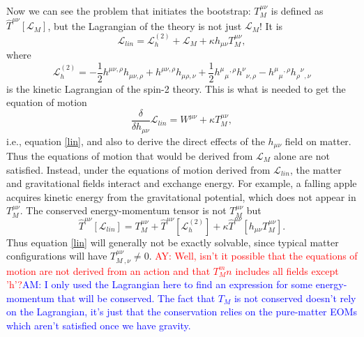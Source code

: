\documentclass[aps,physrev,preprint,groupedaddress]{revtex4-2}
\newcommand{\AY}[1]{\textcolor{red}{AY: #1}}
\newcommand{\AM}[1]{\textcolor{blue}{AM: #1}}
\begin{document}
Now we can see the problem that initiates the bootstrap: \(T_{M}^{\mu\nu}\) is defined as \({\widehat{T}}^{\mu\nu}\left\lbrack \mathcal{L}_M \right\rbrack\), but the Lagrangian of the theory is not just \(\mathcal{L}_{M}\)! It is
\begin{equation}
\mathcal{L}_{lin}=\mathcal{L}_{h}^{(2)}+\mathcal{L}_{M}+\kappa h_{\mu\nu}T_M^{\mu\nu},
\end{equation}
where
\begin{equation} \label{Lh2}
\mathcal{L}_{h}^{(2)} = - \frac{1}{2}h^{\mu\nu,\rho}h_{\mu\nu,\rho} + h^{\mu\nu,\rho}h_{\mu\rho,\nu} + \frac{1}{2}h^\mu{}_\mu{}^{,\rho}h^\nu{}_{\nu,\rho} - h^\mu{}_\mu{}^{,\rho}h_\rho{}^\nu{}_{,\nu}
\end{equation}
is the kinetic Lagrangian of the spin-2 theory. This is what is needed to get the equation of motion
\begin{equation}
\frac{\delta}{\delta h_{\mu\nu}}\mathcal{L}_{lin}=W^{\mu\nu}+\kappa T_M^{\mu\nu},
\end{equation}
i.e., equation \eqref{lin}, and also to derive the direct effects of the \(h_{\mu\nu}\) field on matter. Thus the equations of motion that would be derived from \(\mathcal{L}_{M}\) alone are not satisfied. Instead, under the equations of motion derived from \(\mathcal{L}_{lin}\), the matter and gravitational fields interact and exchange energy. For example, a falling apple acquires kinetic energy from the gravitational potential, which does not appear in \(T_{M}^{\mu\nu}\). The conserved energy-momentum tensor is not \(T_{M}^{\mu\nu}\) but
\begin{equation}
{\widehat{T}}^{\mu\nu}\left\lbrack \mathcal{L}_{lin} \right\rbrack = T_{M}^{\mu\nu} + {\widehat{T}}^{\mu\nu}\left\lbrack \mathcal{L}_{h}^{(2)} \right\rbrack + \kappa{\widehat{T}}^{\mu\nu}\left\lbrack h_{\mu\nu}T_M^{\mu\nu} \right\rbrack.
\end{equation}
Thus equation \eqref{lin} will generally not be exactly solvable, since typical matter configurations will have \(T_{M\ ,\nu}^{\mu\nu} \neq 0\). \AY{Well, isn't it possible that the equations of motion are not derived from an action and that $T_M^mn$ includes all fields except 'h'?}\AM{I only used the Lagrangian here to find an expression for some energy-momentum that will be conserved. The fact that $T_M$ is not conserved doesn't rely on the Lagrangian, it's just that the conservation relies on the pure-matter EOMs which aren't satisfied once we have gravity.}
\end{document}
